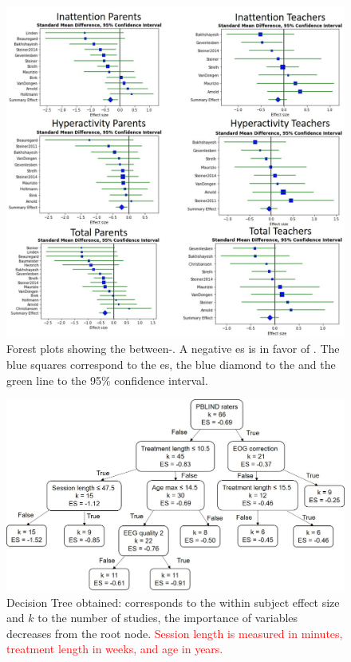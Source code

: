 \begin{figure}[h!]
  \centering
  \includegraphics[width=1.0\linewidth]{figures/meta_review_forest_plots_update_meta_analysis_our_choices_no_colors_2-columns_fitting_image.jpg}
  \caption{Forest plots showing the between-. A negative \gls{es} is in favor of . 
	The blue squares correspond to the \gls{es}, the blue diamond to the  and the green line to the 95\% confidence interval.}
  \label{Figure:meta_review_forest_plots_update_meta_analysis_our_choices_no_colors_2-columns_fitting_image}
\end{figure}

\begin{figure}[h!]
  \centering
  \includegraphics[width=1.0\linewidth]{figures/factors_analysis_decision_tree_results_no_colors_2-columns_fitting_image.jpg}
  \caption{Decision Tree obtained:  corresponds to the within subject effect size and $k$ to the number of studies, 
  the importance of variables decreases from the root node. \textcolor{red}{Session length is measured in minutes, treatment length in weeks, and age in years.}}
  \label{Figure:factors_analysis_decision_tree_results}
\end{figure}

